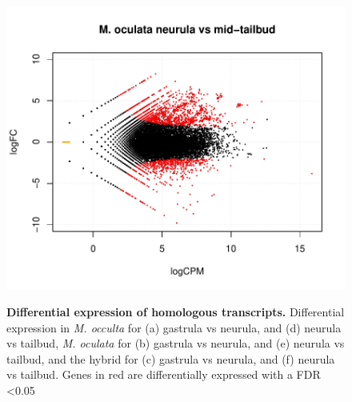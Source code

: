 \begin{landscape}
\begin{figure}[!H]
{	\includegraphics[scale=0.45]{figures/mocu4v6_graph.pdf}
	}
	\caption{\textbf{Differential expression of homologous transcripts.} Differential expression in \textit{M. occulta} for (a) gastrula vs neurula, and (d) neurula vs tailbud, \textit{M. oculata} for (b) gastrula vs neurula, and (e) neurula vs tailbud, and the hybrid for (c) gastrula vs neurula, and (f) neurula vs tailbud. Genes in red are differentially expressed with a FDR \textless 0.05}
	\label{fig:de_plots}
\end{figure}
\end{landscape}

